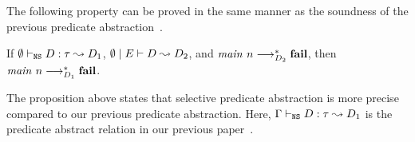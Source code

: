 
The following property can be proved in the same manner as the soundness
of the previous predicate abstraction~\cite{KobayashiPLDI2011}.
\begin{proposition}
 If ${\emptyset} \vdash_{\texttt{NS}} {D} : {\tau} \leadsto {D_1}$,
 ${\emptyset} \mid {E} \vdash {D} \leadsto {D_2}$, and
 ${\mathit{main}}~{n} \longrightarrow_{D_2}^* \mathbf{fail}$, then
 ${\mathit{main}}~{n} \longrightarrow_{D_1}^* \mathbf{fail}$.
\end{proposition}
The proposition above states that selective predicate abstraction is
more precise compared to our previous predicate abstraction.  Here,
${\Gamma} \vdash_{\texttt{NS}} {D} : {\tau} \leadsto {D_1}$ is the predicate abstract relation in
our previous paper~\cite{KobayashiPLDI2011}.


%
%
%
%
%
%
%
%
%
%
%
%
%
%
%
%
%
%





